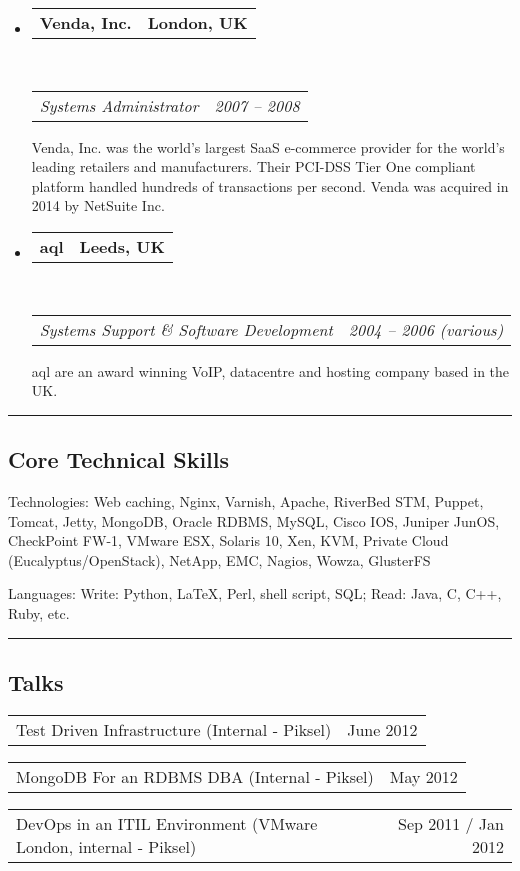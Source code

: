 \documentclass[10pt,a4paper]{article}
\makeatletter
\newenvironment{indentsection}[1]%
{\begin{list}{}%
    {\setlength{\leftmargin}{#1}}%
    \item[]%
}
{\end{list}}
\newcommand{\headerrow}[2]
{\begin{tabular*}{\linewidth}{l@{\extracolsep{\fill}}r}
    #1 &
    #2 \\
\end{tabular*}}
\makeatother
\begin{document}
\begin{itemize}
    \item
        \headerrow
            {\textbf{Venda, Inc.}}
            {\textbf{London, UK}}
        \\
        \headerrow
            {\emph{Systems Administrator}}
            {\emph{2007 -- 2008}}
    
            Venda, Inc. was the world's largest SaaS e-commerce provider for the world's leading retailers and manufacturers. Their PCI-DSS Tier One compliant platform handled hundreds of transactions per second. Venda was acquired in 2014 by NetSuite Inc.
    \item
        \headerrow
            {\textbf{aql}}
            {\textbf{Leeds, UK}}
        \\
        \headerrow
            {\emph{Systems Support \& Software Development}}
            {\emph{2004 -- 2006 (various)}}
    
            aql are an award winning VoIP, datacentre and hosting company based in the UK.
\end{itemize}


\hrule
\vspace{-0.4em}
\subsection*{Core Technical Skills}

\begin{indentsection}{\parindent}
\begin{description*}
    \item[Technologies:]
    Web caching, Nginx, Varnish, Apache, RiverBed STM, Puppet, Tomcat, Jetty, MongoDB, Oracle RDBMS, MySQL, Cisco IOS, Juniper JunOS, CheckPoint FW-1, VMware ESX, Solaris 10, Xen, KVM, Private Cloud (Eucalyptus/OpenStack), NetApp, EMC, Nagios, Wowza, GlusterFS
    \item[Languages:]
    Write: Python, \LaTeX, Perl, shell script, SQL; Read: Java, C, C++, Ruby, etc.
\end{description*}
\end{indentsection}


\hrule
\vspace{-0.4em}
\subsection*{Talks}
    \headerrow
        {Test Driven Infrastructure (Internal - Piksel)}
        {June 2012}
    \headerrow
        {MongoDB For an RDBMS DBA (Internal - Piksel)}
        {May 2012}
    \headerrow
        {DevOps in an ITIL Environment (VMware London, internal - Piksel)}
        {Sep 2011 / Jan 2012}
\end{document}
